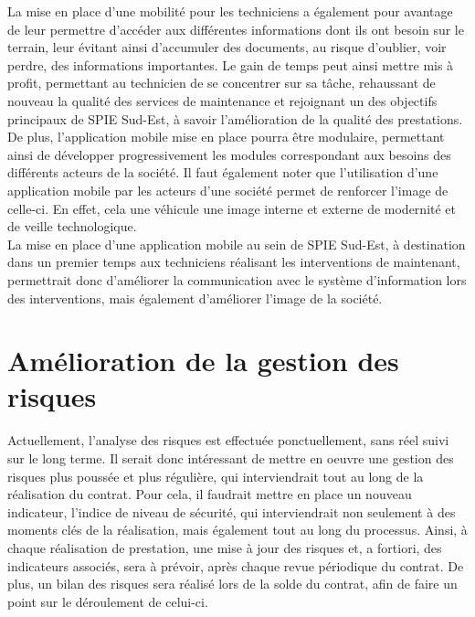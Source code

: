 La mise en place d’une mobilité pour les techniciens a également pour avantage de leur permettre d’accéder aux différentes informations dont ils ont besoin sur le terrain, leur évitant ainsi d’accumuler des documents, au risque d’oublier, voir perdre, des informations importantes. Le gain de temps peut ainsi mettre mis à profit, permettant au technicien de se concentrer sur sa tâche, rehaussant de nouveau la qualité des services de maintenance et rejoignant un des objectifs principaux de SPIE Sud-Est, à savoir l’amélioration de la qualité des prestations. \\

De plus, l’application mobile mise en place pourra être modulaire, permettant ainsi de développer progressivement les modules correspondant aux besoins des différents acteurs de la société. Il faut également noter que l’utilisation d’une application mobile par les acteurs d’une société permet de renforcer l’image de celle-ci. En effet, cela une véhicule une image interne et externe de modernité et de veille technologique.\\

La mise en place d’une application mobile au sein de SPIE Sud-Est, à destination dans un premier temps aux techniciens réalisant les interventions de maintenant, permettrait donc d’améliorer la communication avec le système d’information lors des interventions, mais également d’améliorer l’image de la société.\\

\section{Amélioration de la gestion des risques}

Actuellement, l’analyse des risques est effectuée ponctuellement, sans réel suivi sur le long terme. Il serait donc intéressant de mettre en oeuvre une gestion des risques plus poussée et plus régulière, qui interviendrait tout au long de la réalisation du contrat. Pour cela, il faudrait mettre en place un nouveau indicateur, l’indice de niveau de sécurité, qui interviendrait non seulement à des moments clés de la réalisation, mais également tout au long du processus. Ainsi, à chaque réalisation de prestation, une mise à jour des risques et, a fortiori, des indicateurs associés, sera à prévoir, après chaque revue périodique du contrat. De plus, un bilan des risques sera réalisé lors de la solde du contrat, afin de faire un point sur le déroulement de celui-ci. \\

